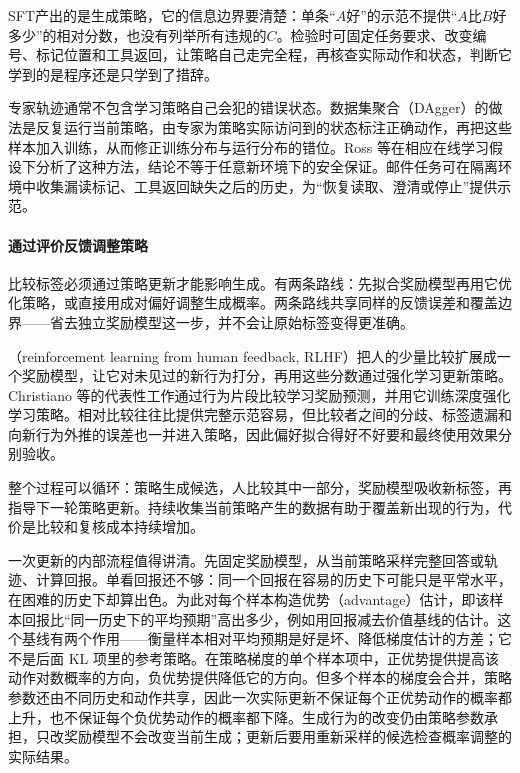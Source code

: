 SFT产出的是生成策略，它的信息边界要清楚：单条“$A$好”的示范不提供“$A$比$B$好多少”的相对分数，也没有列举所有违规的$C$。检验时可固定任务要求、改变编号、标记位置和工具返回，让策略自己走完全程，再核查实际动作和状态，判断它学到的是程序还是只学到了措辞。

专家轨迹通常不包含学习策略自己会犯的错误状态。数据集聚合（DAgger）的做法是反复运行当前策略，由专家为策略实际访问到的状态标注正确动作，再把这些样本加入训练，从而修正训练分布与运行分布的错位。Ross 等在相应在线学习假设下分析了这种方法，结论不等于任意新环境下的安全保证。邮件任务可在隔离环境中收集漏读标记、工具返回缺失之后的历史，为“恢复读取、澄清或停止”提供示范。

\paragraph{通过评价反馈调整策略}

比较标签必须通过策略更新才能影响生成。有两条路线：先拟合奖励模型再用它优化策略，或直接用成对偏好调整生成概率。两条路线共享同样的反馈误差和覆盖边界——省去独立奖励模型这一步，并不会让原始标签变得更准确。

（reinforcement learning from human feedback, RLHF）把人的少量比较扩展成一个奖励模型，让它对未见过的新行为打分，再用这些分数通过强化学习更新策略。Christiano 等的代表性工作通过行为片段比较学习奖励预测，并用它训练深度强化学习策略。相对比较往往比提供完整示范容易，但比较者之间的分歧、标签遗漏和向新行为外推的误差也一并进入策略，因此偏好拟合得好不好要和最终使用效果分别验收。

整个过程可以循环：策略生成候选，人比较其中一部分，奖励模型吸收新标签，再指导下一轮策略更新。持续收集当前策略产生的数据有助于覆盖新出现的行为，代价是比较和复核成本持续增加。

一次更新的内部流程值得讲清。先固定奖励模型，从当前策略采样完整回答或轨迹、计算回报。单看回报还不够：同一个回报在容易的历史下可能只是平常水平，在困难的历史下却算出色。为此对每个样本构造优势（advantage）估计，即该样本回报比“同一历史下的平均预期”高出多少，例如用回报减去价值基线的估计。这个基线有两个作用——衡量样本相对平均预期是好是坏、降低梯度估计的方差；它不是后面 KL 项里的参考策略。在策略梯度的单个样本项中，正优势提供提高该动作对数概率的方向，负优势提供降低它的方向。但多个样本的梯度会合并，策略参数还由不同历史和动作共享，因此一次实际更新不保证每个正优势动作的概率都上升，也不保证每个负优势动作的概率都下降。生成行为的改变仍由策略参数承担，只改奖励模型不会改变当前生成；更新后要用重新采样的候选检查概率调整的实际结果。


